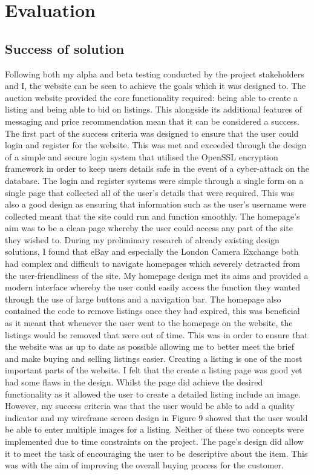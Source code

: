 \chapter{Evaluation}
\section{Success of solution}
Following both my alpha and beta testing conducted by the project stakeholders and I, the website can be seen to achieve the goals which it was designed to. The auction website provided the core functionality required: being able to create a listing and being able to bid on listings. This alongside its additional features of messaging and price recommendation mean that it can be considered a success.
The first part of the success criteria was designed to ensure that the user could login and register for the website. This was met and exceeded through the design of a simple and secure login system that utilised the OpenSSL encryption framework \parencite{openssl} in order to keep users details safe in the event of a cyber-attack on the database. The login and register systems were simple through a single form on a single page that collected all of the user’s details that were required. This was also a good design as ensuring that information such as the user’s username were collected meant that the site could run and function smoothly. 
The homepage’s aim was to be a clean page whereby the user could access any part of the site they wished to. During my preliminary research of already existing design solutions, I found that eBay \parencite{ebay1} and especially the London Camera Exchange \parencite{lcegroup} both had complex and difficult to navigate homepages which severely detracted from the user-friendliness of the site. My homepage design met its aims and provided a modern interface whereby the user could easily access the function they wanted through the use of large buttons and a navigation bar. The homepage also contained the code to remove listings once they had expired, this was beneficial as it meant that whenever the user went to the homepage on the website, the listings would be removed that were out of time. This was in order to ensure that the website was as up to date as possible allowing me to better meet the brief and make buying and selling listings easier.
Creating a listing is one of the most important parts of the website. I felt that the create a listing page was good yet had some flaws in the design. Whilst the page did achieve the desired functionality as it allowed the user to create a detailed listing include an image. However, my success criteria was that the user would be able to add a quality indicator and my wireframe screen design in Figure 9 showed that the user would be able to enter multiple images for a listing. Neither of these two concepts were implemented due to time constraints on the project. The page’s design did allow it to meet the task of encouraging the user to be descriptive about the item. This was with the aim of improving the overall buying process for the customer.
